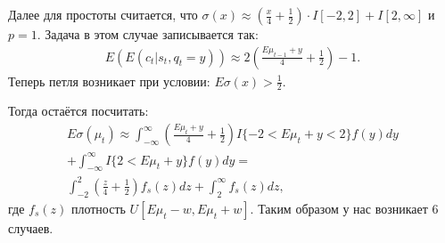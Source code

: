 \documentclass[12pt, twoside]{article}
\begin{document}
Далее для простоты считается, что $\sigma(x) \approx \left(\frac{x}{4} + \frac{1}{2} \right) \cdot I[-2, 2] + I[2, \infty]$ и $p = 1$.
Задача в этом случае записывается так:
\begin{gather*}
  E (E (c_t | s_t, q_t = y)) \approx  2 \left(\frac{E \mu_{t-1} + y}{4} + \frac{1}{2}\right) - 1.   
\end{gather*}
Теперь петля возникает при условии: $E\sigma(x) > \frac{1}{2}$. 

Тогда остаётся посчитать:
\begin{gather*}
  E \sigma(\mu_t) \approx \int_{-\infty}^{\infty} \left(\frac{E \mu_t + y}{4} + \frac{1}{2} \right) I\{-2 < E\mu_t +y < 2\} f(y)dy \\
  + \int_{-\infty}^{\infty} I\{2 < E\mu_t +y \}f(y) dy = \\
  \int_{-2}^{2} \left(\frac{z}{4} + \frac{1}{2} \right) f_s(z)dz 
  + \int_{2}^{\infty} f_s(z) dz,
\end{gather*}
где $f_s(z)$ плотность $U[E\mu_t - w, E\mu_t + w]$.
Таким образом у нас возникает $6$ случаев.
\end{document}
